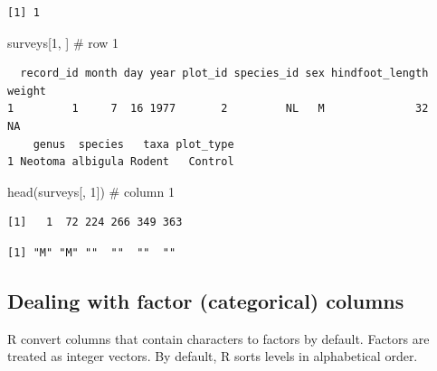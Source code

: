 \documentclass[
  letterpaper,
  DIV=11,
  numbers=noendperiod]{scrreprt}
\newenvironment{Shaded}{\begin{snugshade}}{\end{snugshade}}
\newcommand{\CommentTok}[1]{\textcolor[rgb]{0.37,0.37,0.37}{#1}}
\newcommand{\DecValTok}[1]{\textcolor[rgb]{0.68,0.00,0.00}{#1}}
\newcommand{\FunctionTok}[1]{\textcolor[rgb]{0.28,0.35,0.67}{#1}}
\newcommand{\NormalTok}[1]{\textcolor[rgb]{0.00,0.23,0.31}{#1}}
\newcommand{\SpecialCharTok}[1]{\textcolor[rgb]{0.37,0.37,0.37}{#1}}
\begin{document}
\begin{verbatim}
[1] 1
\end{verbatim}

\begin{Shaded}
\begin{Highlighting}[]
\NormalTok{surveys[}\DecValTok{1}\NormalTok{, ] }\CommentTok{\# row 1}
\end{Highlighting}
\end{Shaded}

\begin{verbatim}
  record_id month day year plot_id species_id sex hindfoot_length weight
1         1     7  16 1977       2         NL   M              32     NA
    genus  species   taxa plot_type
1 Neotoma albigula Rodent   Control
\end{verbatim}

\begin{Shaded}
\begin{Highlighting}[]
\FunctionTok{head}\NormalTok{(surveys[, }\DecValTok{1}\NormalTok{]) }\CommentTok{\# column 1}
\end{Highlighting}
\end{Shaded}

\begin{verbatim}
[1]   1  72 224 266 349 363
\end{verbatim}

\begin{Shaded}
\end{Shaded}

\begin{verbatim}
[1] "M" "M" ""  ""  ""  "" 
\end{verbatim}

\subsection{Dealing with factor (categorical)
columns}\label{dealing-with-factor-categorical-columns}

R convert columns that contain characters to factors by default. Factors
are treated as integer vectors. By default, R sorts levels in
alphabetical order.

\begin{Shaded}
\end{Shaded}
\end{document}

